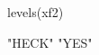 \begin{Schunk}
\begin{Sinput}
  levels(xf2)
\end{Sinput}
\begin{Soutput}
[1] "HECK" "YES" 
\end{Soutput}
\end{Schunk}
